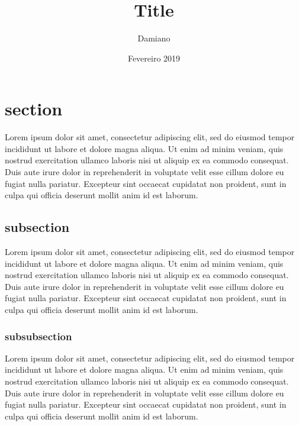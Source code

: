 \documentclass[12pt]{article}
\begin{document}
    \title{Title}
    \author{Damiano}
    \date{Fevereiro 2019}
    \maketitle
    \thispagestyle{empty}
    \newpage
    
    \setcounter{page}{1}
    \tableofcontents
    \newpage
    
    \listoffigures
    \newpage
    
    \listoftables
    \newpage
    
    \section{section}
    Lorem ipsum dolor sit amet, consectetur adipiscing elit, sed do eiusmod tempor incididunt ut labore et dolore magna aliqua. Ut enim ad minim veniam, quis nostrud exercitation ullamco laboris nisi ut aliquip ex ea commodo consequat. Duis aute irure dolor in reprehenderit in voluptate velit esse cillum dolore eu fugiat nulla pariatur. Excepteur sint occaecat cupidatat non proident, sunt in culpa qui officia deserunt mollit anim id est laborum. 

    \subsection{subsection}
    Lorem ipsum dolor sit amet, consectetur adipiscing elit, sed do eiusmod tempor incididunt ut labore et dolore magna aliqua. Ut enim ad minim veniam, quis nostrud exercitation ullamco laboris nisi ut aliquip ex ea commodo consequat. Duis aute irure dolor in reprehenderit in voluptate velit esse cillum dolore eu fugiat nulla pariatur. Excepteur sint occaecat cupidatat non proident, sunt in culpa qui officia deserunt mollit anim id est laborum.
    
    \subsubsection{subsubsection}
    Lorem ipsum dolor sit amet, consectetur adipiscing elit, sed do eiusmod tempor incididunt ut labore et dolore magna aliqua. Ut enim ad minim veniam, quis nostrud exercitation ullamco laboris nisi ut aliquip ex ea commodo consequat. Duis aute irure dolor in reprehenderit in voluptate velit esse cillum dolore eu fugiat nulla pariatur. Excepteur sint occaecat cupidatat non proident, sunt in culpa qui officia deserunt mollit anim id est laborum.
    
\end{document}
